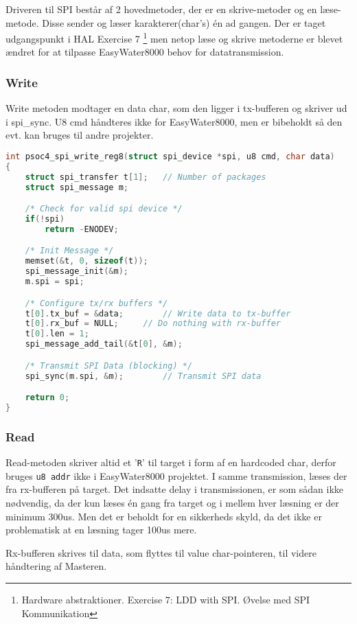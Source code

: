 
Driveren til SPI består af 2 hovedmetoder, der er en skrive-metoder og en læse-metode. Disse sender og læser karakterer(char's) én ad gangen. Der er taget udgangspunkt i HAL Exercise 7 \footnote{Hardware abstraktioner. Exercise 7: LDD with SPI. Øvelse med SPI Kommunikation} men netop læse og skrive metoderne er blevet ændret for at tilpasse EasyWater8000 behov for datatransmission.

\subsubsection*{Write}

Write metoden modtager en data char, som den ligger i tx-bufferen og skriver ud i spi\_sync. 
U8 cmd håndteres ikke for EasyWater8000, men er bibeholdt så den evt. kan bruges til andre projekter.

\begin{lstlisting}[language=C]
int psoc4_spi_write_reg8(struct spi_device *spi, u8 cmd, char data)
{
	struct spi_transfer t[1];	// Number of packages
	struct spi_message m;

	/* Check for valid spi device */
	if(!spi)
		return -ENODEV;

	/* Init Message */
	memset(&t, 0, sizeof(t)); 
	spi_message_init(&m);
	m.spi = spi;

	/* Configure tx/rx buffers */
	t[0].tx_buf = &data;		// Write data to tx-buffer
	t[0].rx_buf = NULL;		// Do nothing with rx-buffer
	t[0].len = 1;			
	spi_message_add_tail(&t[0], &m);

	/* Transmit SPI Data (blocking) */
	spi_sync(m.spi, &m);		// Transmit SPI data

	return 0;
}
\end{lstlisting}

\subsubsection*{Read}

Read-metoden skriver altid et '\verb+R+' til target i form af en hardcoded char, derfor bruges \verb+u8 addr+ ikke i EasyWater8000 projektet. I samme transmission, læses der fra rx-bufferen på target. Det indsatte delay i transmissionen, er som sådan ikke nødvendig, da der kun læses én gang fra target og i mellem hver læsning er der minimum 300us. Men det er beholdt for en sikkerheds skyld, da det ikke er problematisk at en læsning tager 100us mere.

Rx-bufferen skrives til data, som flyttes til value char-pointeren, til videre håndtering af Masteren.

